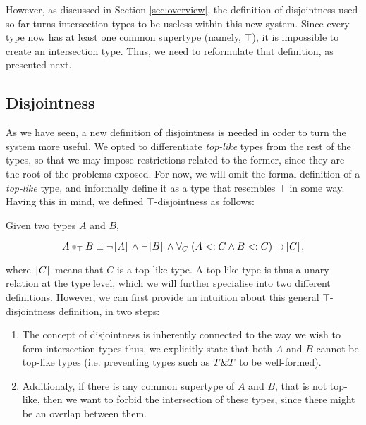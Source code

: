 However, as discussed in Section \ref{sec:overview}, the definition of disjointness used so far turns intersection types to
be useless within this new system.
Since every type now has at least one common supertype (namely, $\top$), it is impossible to create an intersection type.
Thus, we need to reformulate that definition, as presented next. 

\subsection{Disjointness} 

As we have seen, a new definition of disjointness is needed in order to turn the system more useful.
We opted to differentiate \emph{top-like} types from the rest of the types,
so that we may impose restrictions related to the former, since they are the 
root of the problems exposed.
For now, we will omit the formal definition of a \emph{top-like} type, and informally
define it as a type that resembles $\top$ in some way. 
Having this in mind, we defined $\top$-disjointness as follows:
\begin{definition}
Given two types $A$ and $B$, 

\[A *_{\top} B \equiv \neg \rceil A \lceil \; \wedge \; \neg \rceil B \lceil \; \wedge \; 
\forall_C \; ( A <: C \wedge B <: C ) \rightarrow \rceil C \lceil, \]

\end{definition}
where $\rceil C \lceil$ means that $C$ is a top-like type.
A top-like type is thus a unary relation at the type level, which we will further specialise into two different definitions. 
However, we can first provide an intuition about this general $\top$-disjointness definition, in two steps:
\begin{enumerate}
\item The concept of disjointness is inherently connected to the way we wish to form intersection types thus,
we explicitly state that both $A$ and $B$ cannot be top-like types (i.e. preventing types such as $T \& T$ to be well-formed).
\item Additionaly, if there is any common supertype of $A$ and $B$, that is not top-like, then we want to forbid the 
intersection of these types, since there might be an overlap between them. 
\end{enumerate}

